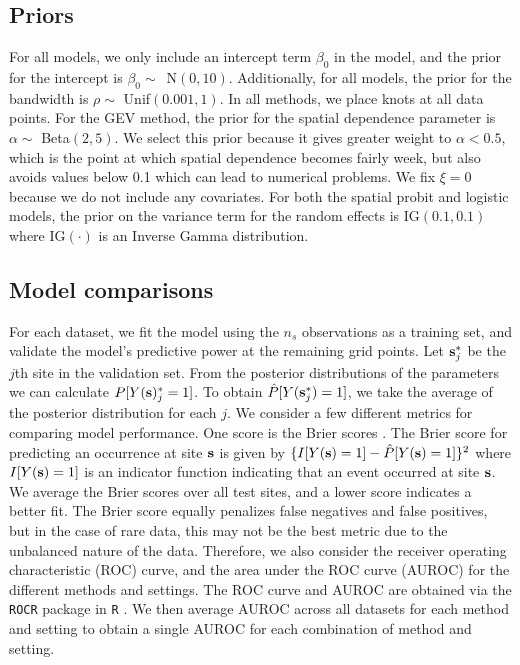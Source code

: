 \subsection{Priors} \label{rbs:simpriors}
For all models, we only include an intercept term $\beta_0$ in the model, and the prior for the intercept is \mbox{$\beta_0 \sim$ N$(0, 10)$}.
Additionally, for all models, the prior for the bandwidth is $\rho \sim$ Unif$(0.001, 1)$.
In all methods, we place knots at all data points.
For the GEV method, the prior for the spatial dependence parameter is $\alpha \sim$ Beta$(2, 5)$.
We select this prior because it gives greater weight to $\alpha < 0.5$, which is the point at which spatial dependence becomes fairly week, but also avoids values below 0.1 which can lead to numerical problems.
We fix $\xi = 0$ because we do not include any covariates.
For both the spatial probit and logistic models, the prior on the variance term for the random effects is IG$(0.1, 0.1)$ where IG$(\cdot)$ is an Inverse Gamma distribution.

\subsection{Model comparisons}\label{rbs:cv}
For each dataset, we fit the model using the $n_s$ observations as a training set, and validate the model's predictive power at the remaining grid points.
Let $\mathbf{s}^*_j$ be the $j$th site in the validation set.
From the posterior distributions of the parameters we can calculate $P[Y(\mathbf{s})^*_j = 1]$.
To obtain $\hat{P}[Y(\mathbf{s}^*_j) = 1]$, we take the average of the posterior distribution for each $j$.
We consider a few different metrics for comparing model performance.
One score is the Brier scores \citep[BS]{Gneiting2007}.
The Brier score for predicting an occurrence at site $\mathbf{s}$ is given by $\{I[Y(\mathbf{s})=1] - \hat{P}[Y(\mathbf{s})=1]\}^2$ where $I[Y(\mathbf{s}) = 1]$ is an indicator function indicating that an event occurred at site $\mathbf{s}$.
We average the Brier scores over all test sites, and a lower score indicates a better fit.
The Brier score equally penalizes false negatives and false positives, but in the case of rare data, this may not be the best metric due to the unbalanced nature of the data.
Therefore, we also consider the receiver operating characteristic (ROC) curve, and the area under the ROC curve (AUROC) for the different methods and settings.
The ROC curve and AUROC are obtained via the \texttt{ROCR} \citep{Sing2005} package in \texttt{R} \citep{Rmanual}.
We then average AUROC across all datasets for each method and setting to obtain a single AUROC for each combination of method and setting.


